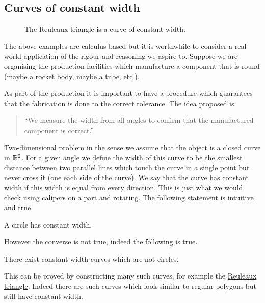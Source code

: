 \subsection*{Curves of constant width}
%
\begin{figure}[htb]
  \centering
  
  \caption{The Reuleaux triangle is a curve of constant width.}
  \label{fig:reuleaux}
\end{figure}
%
The above examples are calculus based but it is worthwhile to consider a real world application of the rigour and reasoning we aspire to.
Suppose we are organising the production facilities which manufacture a component that is round (maybe a rocket body, maybe a tube, etc.).
\begin{samepage}
  As part of the production it is important to have a procedure which guarantees that the fabrication is done to the correct tolerance.
  The idea proposed is:
  \begin{quotation}
    ``We measure the width from all angles to confirm that the manufactured component is correct.''
  \end{quotation}
\end{samepage}
Two-dimensional problem in the sense we assume that the object is a closed curve in \(\mathbb{R}^2\).
For a given angle we define the width of this curve to be the smallest distance between two parallel lines which touch the curve in a single point but never cross it (one each side of the curve).
We say that the curve has constant width if this width is equal from every direction.
This is just what we would check using calipers on a part and rotating.
The following statement is intuitive and true.
\begin{theorem*}
  A circle has constant width.
\end{theorem*}
\noindent
However the converse is not true, indeed the following is true.
\begin{theorem*}
  There exist constant width curves which are not circles.
\end{theorem*}
\noindent
This can be proved by constructing many such curves, for example the \href{https://en.wikipedia.org/wiki/Reuleaux_triangle}{Reuleaux triangle}. Indeed there are such curves which look similar to regular polygons but still have constant width.





